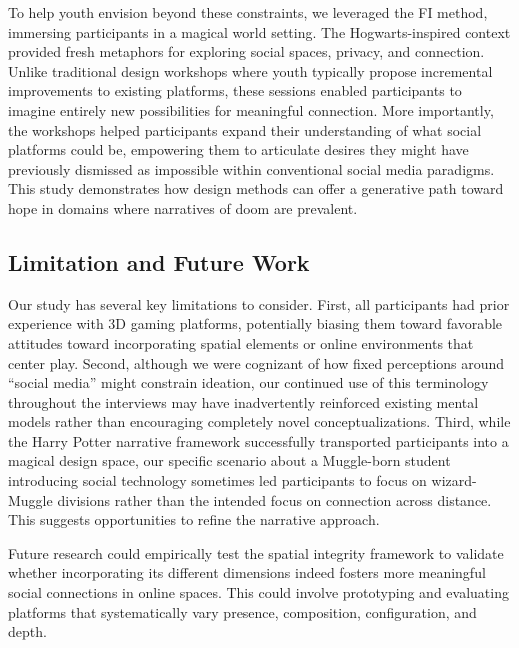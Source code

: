 To help youth envision beyond these constraints, we leveraged the FI method, immersing participants in a magical world setting. The Hogwarts-inspired context provided fresh metaphors for exploring social spaces, privacy, and connection. Unlike traditional design workshops where youth typically propose incremental improvements to existing platforms, these sessions enabled participants to imagine entirely new possibilities for meaningful connection. More importantly, the workshops helped participants expand their understanding of what social platforms could be, empowering them to articulate desires they might have previously dismissed as impossible within conventional social media paradigms. This study demonstrates how design methods can offer a generative path toward hope in domains where narratives of doom are prevalent.

\subsection{Limitation and Future Work}
Our study has several key limitations to consider. First, all participants had prior experience with 3D gaming platforms, potentially biasing them toward favorable attitudes toward incorporating spatial elements or online environments that center play. Second, although we were cognizant of how fixed perceptions around ``social media'' might constrain ideation, our continued use of this terminology throughout the interviews may have inadvertently reinforced existing mental models rather than encouraging completely novel conceptualizations. Third, while the Harry Potter narrative framework successfully transported participants into a magical design space, our specific scenario about a Muggle-born student introducing social technology sometimes led participants to focus on wizard-Muggle divisions rather than the intended focus on connection across distance. This suggests opportunities to refine the narrative approach. 

Future research could empirically test the spatial integrity framework to validate whether incorporating its different dimensions indeed fosters more meaningful social connections in online spaces. This could involve prototyping and evaluating platforms that systematically vary presence, composition, configuration, and depth. 

